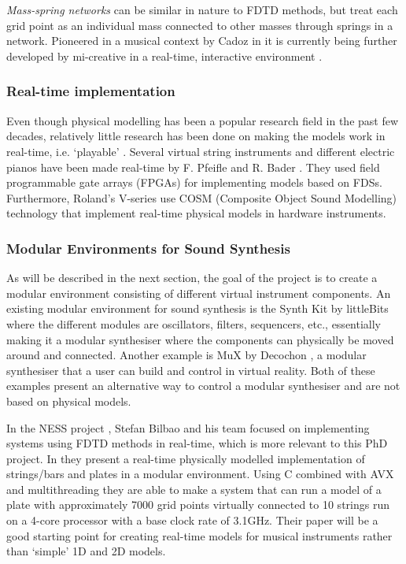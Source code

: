 \\
\\
\textit{Mass-spring networks} can be similar in nature to FDTD methods, but treat each grid point as an individual mass connected to other masses through springs in a network. Pioneered in a musical context by Cadoz in \cite{Cadoz1979, Cadoz1983, Cadoz1993} it is currently being further developed by mi-creative in a real-time, interactive environment \cite{Villeneuve2019, Leonard2019}. 

\subsubsection*{Real-time implementation}
Even though physical modelling has been a popular research field in the past few decades, relatively little research has been done on making the models work in real-time, i.e. `playable’ \cite{Mehes2016}. Several virtual string instruments and different electric pianos have been made real-time by F. Pfeifle and R. Bader \cite{Pfeifle2012, Pfeifle2015, Pfeifle2017}. They used field programmable gate arrays (FPGAs) for implementing models based on FDSs. Furthermore, Roland’s V-series use COSM (Composite Object Sound Modelling) technology \cite{Bybee2019} that implement real-time physical models in hardware instruments.

\subsubsection*{Modular Environments for Sound Synthesis}

As will be described in the next section, the goal of the project is to create a modular environment consisting of different virtual instrument components. An existing modular environment for sound synthesis is the Synth Kit by littleBits \cite{littleBits2019} where the different modules are oscillators, filters, sequencers, etc., essentially making it a modular synthesiser where the components can physically be moved around and connected. Another example is MuX by Decochon \cite{MuX2019}, a modular synthesiser that a user can build and control in virtual reality. Both of these examples present an alternative way to control a modular synthesiser and are not based on physical models.

In the NESS project \cite{NESS2016}, Stefan Bilbao and his team focused on implementing systems using FDTD methods in real-time, which is more relevant to this PhD project. In \cite{Webb2015} they present a real-time physically modelled implementation of strings/bars and plates in a modular environment. Using C combined with AVX and multithreading they are able to make a system that can run a model of a plate with approximately 7000 grid points virtually connected to 10 strings run on a 4-core processor with a base clock rate of 3.1GHz. Their paper will be a good starting point for creating real-time models for musical instruments rather than ‘simple’ 1D and 2D models.

